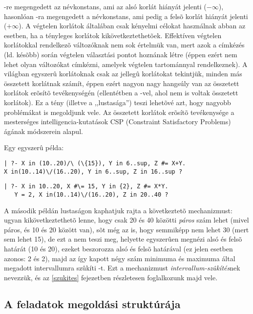 -re megengedett az  névkonstans, ami az alsó korlát
hiányát jelenti ($-\infty$), hasonlóan -ra megengedett a 
névkonstans, ami pedig a felsõ korlát hiányát jelenti ($+\infty$). A végtelen
korlátok általában csak kényelmi célokat használnak abban az esetben, ha
a tényleges korlátok kikövetkeztethetõek. Effektíven végtelen korlátokkal
rendelkezõ változóknak nem sok értelmük van, mert azok a címkézés (ld. késõbb)
során végtelen választási pontot hoznának létre (éppen ezért nem lehet olyan
változókat címkézni, amelyek végtelen tartománnyal rendelkeznek).
\br
A \clpfd világban egyszerû korlátoknak csak az 
jellegû korlátokat tekintjük, minden más összetett korlátnak számít, éppen
ezért nagyon nagy hangsúly van az összetett korlátok erõsítõ tevékenységén
(ellentétben a \Clpb -vel, ahol nem is voltak összetett korlátok). Ez a tény
(illetve a \clpfd ,,lustasága'') teszi lehetõvé azt, hogy nagyobb problémákat
is megoldjunk vele. Az összetett korlátok erõsítõ tevékenysége a mesterséges
intelligencia-kutatások CSP (Constraint Satisfactory Problems) ágának
módszerein alapul.

Egy egyszerû \clpfd példa:

\begin{verbatim}
| ?- X in (10..20)/\ (\{15}), Y in 6..sup, Z #= X+Y.
X in(10..14)\/(16..20), Y in 6..sup, Z in 16..sup ? 
\end{verbatim}
\begin{verbatim}
| ?- X in 10..20, X #\= 15, Y in {2}, Z #= X*Y.
   Y = 2, X in(10..14)\/(16..20), Z in 20..40 ? 
\end{verbatim}

A második példán lustaságon kaphatjuk rajta a \clpfd következtetõ mechanizmust:
ugyan kikövetkeztethetõ lenne, hogy  csak 20 és 40 közötti \emph{páros}
szám lehet (mivel  páros, és  10 és 20 között van), sõt még
az is, hogy  semmiképp nem lehet 30 (mert  sem lehet 15),
de ezt a \clpfd nem teszi meg, helyette egyszerûen megnézi  alsó és
felsõ határát (10 és 20), ezeket beszorozza  alsó és felsõ határával
(ez jelen esetben azonos: 2 és 2), majd az így kapott négy szám minimuma és
maximuma által megadott intervallumra szûkíti -t. Ezt a mechanizmust
\emph{intervallum-szûkítés}nek nevezzük, és az \ref{szukites} fejezetben
részletesen foglalkozunk majd vele.

\subsection{A \clpfd feladatok megoldási struktúrája}

